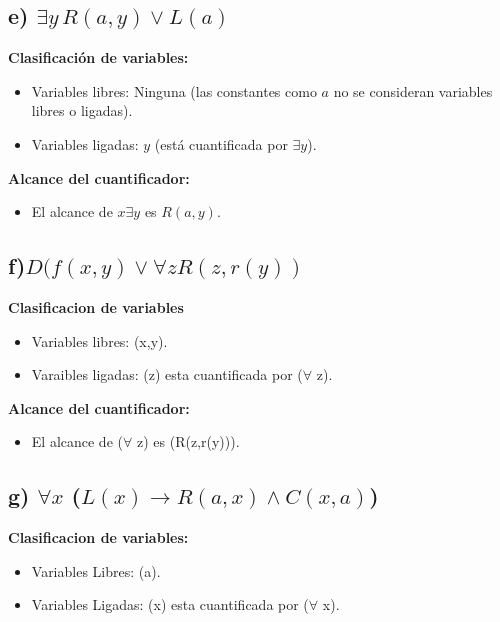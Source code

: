 \documentclass[11pt,letterpaper]{article}
\begin{document}
\subsection*{e) \( \exists y \, R(a, y) \lor L(a) \)}

\textbf{Clasificación de variables:}
\begin{itemize}
    \item Variables libres: Ninguna (las constantes como \( a \) no se consideran variables libres o ligadas).
    \item Variables ligadas: \( y \) (está cuantificada por \( \exists y \)).
\end{itemize}

\textbf{Alcance del cuantificador:}
\begin{itemize}
    \item El alcance de \( x\exists y \) es \( R(a, y) \).
\end{itemize}

\subsection*{f)$ D(f(x,y) \vee \forall z R(z,r(y))$ }

\textbf{Clasificacion de variables}
\begin{itemize}
    \item Variables libres: (x,y).
    \item Varaibles ligadas: (z) esta cuantificada por ($\forall$ z).
\end{itemize}

\textbf{Alcance del cuantificador:}
\begin{itemize}
    \item El alcance de ($\forall$ z) es (R(z,r(y))).
\end{itemize}
  

\subsection*{g) $\forall x$ ($L(x) \rightarrow R(a,x) \wedge  C(x,a)$)}

\textbf{Clasificacion de variables:}
\begin{itemize}
    \item Variables Libres: (a).
    \item Variables Ligadas: (x) esta cuantificada por ($\forall$ x).
\end{itemize}
\end{document}
